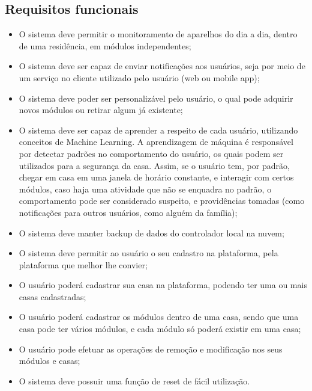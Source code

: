 \subsection{Requisitos funcionais}
\begin{itemize}
\item O sistema deve permitir o monitoramento de aparelhos do dia a dia, dentro de uma residência, em módulos independentes;
\item O sistema deve ser capaz de enviar notificações aos usuários, seja por meio de um serviço no cliente utilizado pelo usuário (web ou mobile app);
\item O sistema deve poder ser personalizável pelo usuário, o qual pode adquirir novos módulos ou retirar algum já existente;
\item O sistema deve ser capaz de aprender a respeito de cada usuário, utilizando conceitos de Machine Learning. A aprendizagem de máquina é responsável por detectar padrões no comportamento do usuário, os quais podem ser utilizados para a segurança da casa. Assim, se o usuário tem, por padrão, chegar em casa em uma janela de horário constante, e interagir com certos módulos, caso haja uma atividade que não se enquadra no padrão, o comportamento pode ser considerado suspeito, e providências tomadas (como notificações para outros usuários, como alguém da família);
\item O sistema deve manter backup de dados do controlador local na nuvem;
\item O sistema deve permitir ao usuário o seu cadastro na plataforma, pela plataforma que melhor lhe convier;
\item O usuário poderá cadastrar sua casa na plataforma, podendo ter uma ou mais casas cadastradas;
\item O usuário poderá cadastrar os módulos dentro de uma casa, sendo que uma casa pode ter vários módulos, e cada módulo só poderá existir em uma casa;
\item O usuário pode efetuar as operações de remoção e modificação nos seus módulos e casas;
\item O sistema deve possuir uma função de reset de fácil utilização.
\end{itemize}

